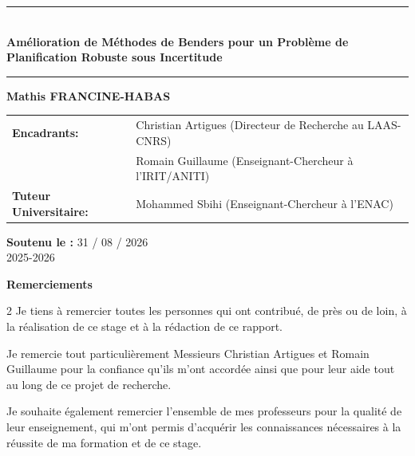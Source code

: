 \documentclass[12pt, a4paper, twoside]{report}
\numberwithin{equation}{section}
\begin{document}
\begin{titlepage}
		\vspace{2.5cm}
		
		\begin{center}
			{\color{mainblue}\rule{\textwidth}{2pt}} \\[0.6cm]
			{\sffamily \Huge \bfseries Amélioration de Méthodes de Benders pour un Problème de Planification Robuste sous Incertitude} \\[0.4cm] 
			{\color{mainblue}\rule{\textwidth}{2pt}}
		\end{center}
		
		\vspace{1.5cm}
		
		\begin{center}
			{\Large \textbf{Mathis FRANCINE-HABAS}} \\[1cm]
			
			\begin{tabular}{ll}
				\textbf{Encadrants:} & Christian Artigues \hfill (Directeur de Recherche au LAAS-CNRS) \\
				& Romain Guillaume \hfill (Enseignant-Chercheur à l'IRIT/ANITI) \\[0.3cm]
				\textbf{Tuteur Universitaire:} & Mohammed Sbihi \hfill (Enseignant-Chercheur à l’ENAC)
			\end{tabular}
		\end{center}
		
		\vfill
		
		\begin{center}
			{\large \textbf{Soutenu le :} 31 / 08 / 2026} \\
			\vspace{0.2cm}
			{\large 2025-2026}
		\end{center}
	\end{titlepage}
	
	\clearpage
	\thispagestyle{empty}
	
	\vspace*{\fill}
	
	\begin{center}
		{\sffamily \Huge \bfseries \textcolor{mainblue}{Remerciements}} \\[1.5cm]
	\end{center}
	
	\begin{spacing}{2}
		Je tiens à remercier toutes les personnes qui ont contribué, de près ou de loin, à la réalisation de ce stage et à la rédaction de ce rapport.
		
		Je remercie tout particulièrement Messieurs Christian Artigues et Romain Guillaume pour la confiance qu'ils m'ont accordée ainsi que pour leur aide tout au long de ce projet de recherche.
		
		Je souhaite également remercier l'ensemble de mes professeurs pour la qualité de leur enseignement, 
		qui m'ont permis d'acquérir les connaissances nécessaires à la réussite de ma formation et de ce stage.
	\end{spacing}
	
\end{document}
